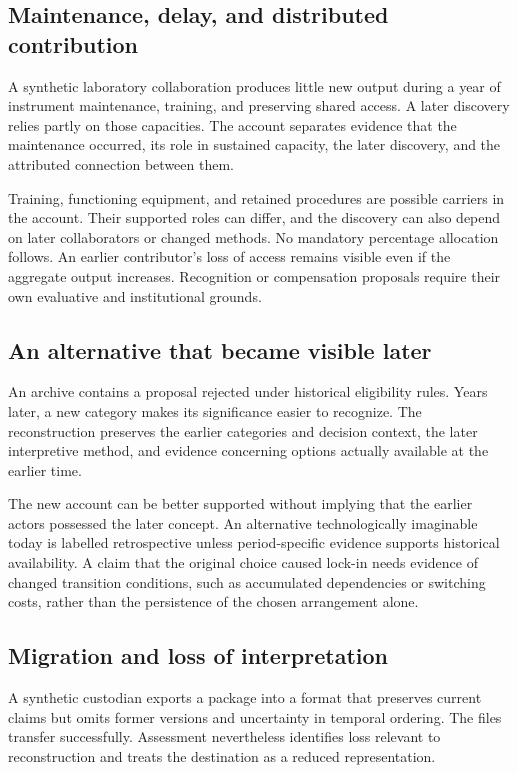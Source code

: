 \documentclass[11pt,a4paper]{article}
\begin{document}
\subsection{Maintenance, delay, and distributed contribution}
A synthetic laboratory collaboration produces little new output during a year of instrument maintenance, training, and preserving shared access. A later discovery relies partly on those capacities. The account separates evidence that the maintenance occurred, its role in sustained capacity, the later discovery, and the attributed connection between them.

Training, functioning equipment, and retained procedures are possible carriers in the account. Their supported roles can differ, and the discovery can also depend on later collaborators or changed methods. No mandatory percentage allocation follows. An earlier contributor's loss of access remains visible even if the aggregate output increases. Recognition or compensation proposals require their own evaluative and institutional grounds.

\subsection{An alternative that became visible later}
An archive contains a proposal rejected under historical eligibility rules. Years later, a new category makes its significance easier to recognize. The reconstruction preserves the earlier categories and decision context, the later interpretive method, and evidence concerning options actually available at the earlier time.

The new account can be better supported without implying that the earlier actors possessed the later concept. An alternative technologically imaginable today is labelled retrospective unless period-specific evidence supports historical availability. A claim that the original choice caused lock-in needs evidence of changed transition conditions, such as accumulated dependencies or switching costs, rather than the persistence of the chosen arrangement alone.

\subsection{Migration and loss of interpretation}
A synthetic custodian exports a package into a format that preserves current claims but omits former versions and uncertainty in temporal ordering. The files transfer successfully. Assessment nevertheless identifies loss relevant to reconstruction and treats the destination as a reduced representation.
\end{document}
